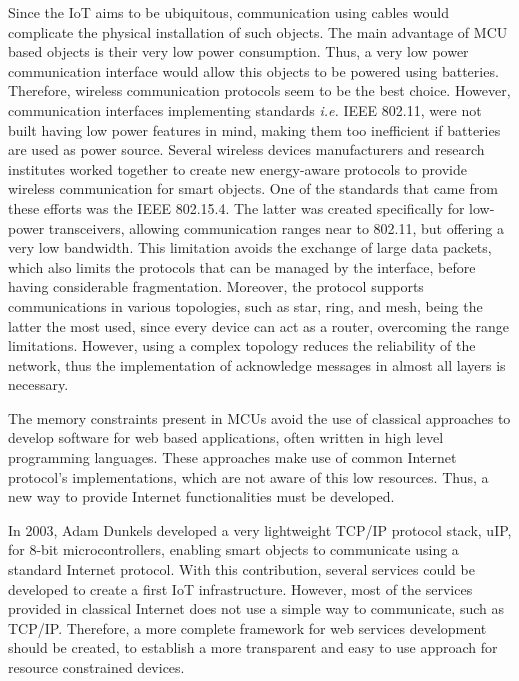 Since the IoT aims to be ubiquitous, communication using cables would complicate the physical installation of such objects.
The main advantage of MCU based objects is their very low power consumption.
Thus, a very low power communication interface would allow this objects to be powered using batteries.
Therefore, wireless communication protocols seem to be the best choice.
However, communication interfaces implementing standards \textit{i.e.} IEEE 802.11, were not built having low power features in mind, making them too inefficient if batteries are used as power source.
Several wireless devices manufacturers and research institutes worked together to create new energy-aware protocols to provide wireless communication for smart objects.
One of the standards that came from these efforts was the IEEE 802.15.4\cite{ieee802.15.4}.
The latter was created specifically for low-power transceivers, allowing communication ranges near to 802.11, but offering a very low bandwidth.
This limitation avoids the exchange of large data packets, which also limits the protocols that can be managed by the interface, before having considerable fragmentation.
Moreover, the protocol supports communications in various topologies, such as star, ring, and mesh, being the latter the most used, since every device can act as a router, overcoming the range limitations.
However, using a complex topology reduces the reliability of the network, thus the implementation of acknowledge messages in almost all layers is necessary.


The memory constraints present in MCUs avoid the use of classical approaches to develop software for web based applications, often written in high level programming languages.
These approaches make use of common Internet protocol's implementations, which are not aware of this low resources.
Thus, a new way to provide Internet functionalities must be developed.

In 2003, Adam Dunkels developed a very lightweight TCP/IP protocol stack, uIP\cite{dunkels03full}, for 8-bit microcontrollers, enabling smart objects to communicate using a standard Internet protocol.
With this contribution, several services could be developed to create a first IoT infrastructure.
However, most of the services provided in classical Internet does not use a simple way to communicate, such as TCP/IP.
Therefore, a more complete framework for web services development should be created, to establish a more transparent and easy to use approach for resource constrained devices.

